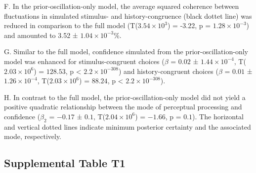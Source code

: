 \documentclass[
]{article}
\begin{document}
F. In the prior-oscillation-only model, the average squared coherence
between fluctuations in simulated stimulus- and history-congruence
(black dottet line) was reduced in comparison to the full model
(T(\ensuremath{3.54\times 10^{3}}) = -3.22, p =
\(\ensuremath{1.28\times 10^{-3}}\)) and amounted to 3.52 ±
\ensuremath{1.04\times 10^{-3}}\%.

G. Similar to the full model, confidence simulated from the
prior-oscillation-only model was enhanced for stimulus-congruent choices
(\(\beta\) = \(0.02\) ± \(\ensuremath{1.44\times 10^{-4}}\),
T(\(\ensuremath{2.03\times 10^{6}}\)) = \(128.53\), p < \(\ensuremath{2.2\times 10^{-308}}\)) and
history-congruent choices (\(\beta\) = \(0.01\) ±
\(\ensuremath{1.26\times 10^{-4}}\),
T(\(\ensuremath{2.03\times 10^{6}}\)) = \(88.24\), p < \(\ensuremath{2.2\times 10^{-308}}\)).

H. In contrast to the full model, the prior-oscillation-only model did
not yield a positive quadratic relationship between the mode of
perceptual processing and confidence (\(\beta_2\) = \(-0.17\) ± \(0.1\),
T(\(\ensuremath{2.04\times 10^{6}}\)) = \(-1.66\), p = \(0.1\)). The
horizontal and vertical dotted lines indicate minimum posterior
certainty and the associated mode, respectively.

\newpage

\hypertarget{supplemental-table-t1}{%
\subsection{Supplemental Table T1}\label{supplemental-table-t1}}

\begingroup\fontsize{7}{9}\selectfont
\end{document}
